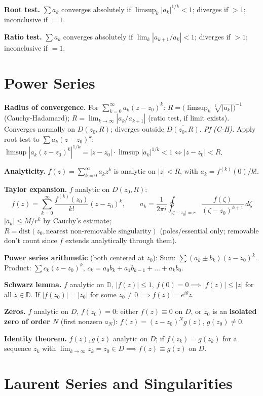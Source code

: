 \documentclass[9pt,twocolumn]{extarticle}
\begin{document}
\textbf{Root test.} $\sum a_k$ converges absolutely if $\limsup_k|a_k|^{1/k}<1$;\; diverges if $>1$;\; inconclusive if $=1$.

\textbf{Ratio test.} $\sum a_k$ converges absolutely if $\lim_k|a_{k+1}/a_k|<1$;\; diverges if $>1$;\; inconclusive if $=1$.

\section{Power Series}

\textbf{Radius of convergence.} For $\sum_{k=0}^\infty a_k(z-z_0)^k$:\;
$R=\bigl(\limsup_k\sqrt[k]{|a_k|}\bigr)^{-1}$ (Cauchy-Hadamard);\;
$R=\lim_{k\to\infty}|a_k/a_{k+1}|$ (ratio test, if limit exists).
Converges normally on $D(z_0,R)$; diverges outside $\overline{D(z_0,R)}$.\;
\textit{Pf (C-H).} Apply root test to $\sum a_k(z{-}z_0)^k$:\; $\limsup|a_k(z{-}z_0)^k|^{1/k}=|z{-}z_0|\cdot\limsup|a_k|^{1/k}<1\iff|z{-}z_0|<R$.

\textbf{Analyticity.} $f(z)=\sum_{k=0}^\infty a_kz^k$ is analytic on $|z|<R$, with $a_k=f^{(k)}(0)/k!$.

\textbf{Taylor expansion.} $f$ analytic on $D(z_0,R)$:
$$f(z)=\sum_{k=0}^\infty\frac{f^{(k)}(z_0)}{k!}(z-z_0)^k,\qquad
  a_k=\frac{1}{2\pi i}\oint_{|\zeta-z_0|=r}\frac{f(\zeta)}{(\zeta-z_0)^{k+1}}\,d\zeta$$
$|a_k|\le M/r^k$ by Cauchy's estimate;\; $R=\mathrm{dist}(z_0,\text{nearest non-removable singularity})$ (poles/essential only; removable don't count since $f$ extends analytically through them).

\textbf{Power series arithmetic} (both centered at $z_0$):\;
Sum: $\sum(a_k\pm b_k)(z-z_0)^k$.\;
Product: $\sum c_k(z-z_0)^k$, $c_k=a_0b_k+a_1b_{k-1}+\dots+a_kb_0$.

\textbf{Schwarz lemma.} $f$ analytic on $\mathbb{D}$, $|f(z)|\le1$, $f(0)=0\implies|f(z)|\le|z|$
for all $z\in\mathbb{D}$.\; If $|f(z_0)|=|z_0|$ for some $z_0\ne0\implies f(z)=e^{i\theta}z$.

\textbf{Zeros.} $f$ analytic on $D$, $f(z_0)=0$: either $f(z)\equiv0$ on $D$, or $z_0$ is an
\textbf{isolated zero of order $N$} (first nonzero $a_N$):\; $f(z)=(z-z_0)^Ng(z)$, $g(z_0)\ne0$.

\textbf{Identity theorem.} $f(z),g(z)$ analytic on $D$; if $f(z_k)=g(z_k)$ for a sequence
$z_k$ with $\lim_{k\to\infty}z_k=z_0\in D\implies f(z)\equiv g(z)$ on $D$.

\section{Laurent Series and Singularities}
\end{document}
